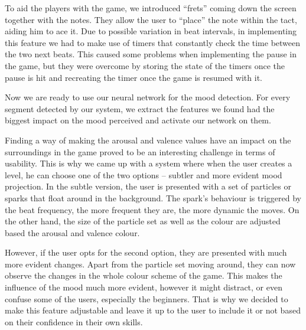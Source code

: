To aid the players with the game, we introduced ``frets'' coming down the screen together with the notes. They allow the user to ``place'' the note within the tact, aiding him to ace it. Due to possible variation in beat intervals, in implementing this feature we had to make use of timers that constantly check the time between the two next beats. This caused some problems when implementing the pause in the game, but they were overcome by storing the state of the timers once the pause is hit and recreating the timer once the game is resumed with it. 

Now we are ready to use our neural network for the mood detection. For every segment detected by our system, we extract the features we found had the biggest impact on the mood perceived and activate our network on them. 

Finding a way of making the arousal and valence values have an impact on the surroundings in the game proved to be an interesting challenge in terms of usability. This is why we came up with a system where when the user creates a level, he can choose one of the two options -- subtler and more evident mood projection. In the subtle version, the user is presented with a set of particles or sparks that float around in the background. The spark's behaviour is triggered by the beat frequency, the more frequent they are, the more dynamic the moves. On the other hand, the size of the particle set as well as the colour are adjusted based the arousal and valence colour.

However, if the user opts for the second option, they are presented with much more evident changes. Apart from the particle set moving around, they can now observe the changes in the whole colour scheme of the game. This makes the influence of the mood much more evident, however it might distract, or even confuse some of the users, especially the beginners. That is why we decided to make this feature adjustable and leave it up to the user to include it or not based on their confidence in their own skills. 

